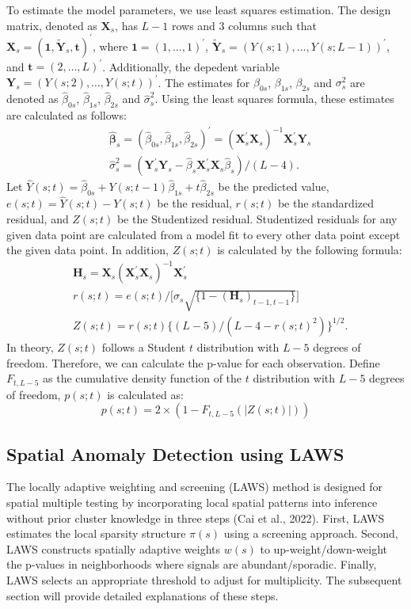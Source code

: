 \documentclass[11pt]{article}
\begin{document}
To estimate the model parameters, we use least squares estimation. The design matrix, denoted as $\bm{X}_s$, has $L-1$ rows and $3$ columns such that $\bm{X}_s=(\mathbf{1}, \tilde{\mathbf{Y}}_s, \mathbf{t})^{\prime}$, where $\mathbf{1}=(1, \ldots, 1)^{\prime}$, $\tilde{\mathbf{Y}}_s=(Y(s;1), \ldots, Y(s;L-1))^{\prime}$, and $\mathbf{t}=(2,\ldots, L)^{\prime}$. Additionally, the depedent variable $\bm{Y}_{s}=(Y(s;2), \ldots, Y(s;t))^{\prime}$. The estimates for $\beta_{0s}$, $\beta_{1s}$, $\beta_{2s}$ and $\sigma_{s}^2$ are denoted as $\hat{\beta}_{0s}$, $\hat{\beta}_{1s}$, $\hat{\beta}_{2s}$ and $\hat{\sigma}_s^2$. Using the least squares formula, these estimates are calculated as follows:
\begin{align}
	&\hat{\bm{\beta}}_s = (\hat{\beta}_{0s}, \hat{\beta}_{1s}, \hat{\beta}_{2s})^{\prime} = (\bm{X}_s^{\prime}\bm{X}_s)^{-1}\bm{X}_s^{\prime}\bm{Y}_s\\
	&\hat{\sigma}_s^2 = (\bm{Y}_s^{\prime}\bm{Y}_s - \hat{\beta}_s\bm{X}_s^{\prime}\bm{X}_s\hat{\beta}_s) / (L-4).
\end{align}
Let $\hat{Y}(s;t)=\hat{\beta}_{0s}+Y(s;t-1)\hat{\beta}_{1s}+t\hat{\beta}_{2s}$ be the predicted value,  $e(s;t)=\hat{Y}(s;t)-Y(s;t)$ be the residual, $r(s;t)$ be the standardized residual, and $Z(s;t)$ be the Studentized residual. Studentized residuals for any given data point are calculated from a model fit to every other data point except the given data point. In addition, $Z(s;t)$ is calculated by the following formula:
\begin{align}
	&\bm{H}_s=\bm{X}_s(\bm{X}_s^{\prime}\bm{X}_s)^{-1}\bm{X}_s^{\prime}\\
	&r(s;t)=e(s;t)/\big[\hat{\sigma}_s\sqrt{\{1-(\bm{H}_s)_{t-1, t-1}\}}\big]\\
	&Z(s;t)=r(s;t)\{(L-5)/(L-4-r(s;t)^2)\}^{1/2}.
\end{align}
In theory, $Z(s;t)$ follows a Student $t$ distribution with $L-5$ degrees of freedom. Therefore, we can calculate the p-value for each observation. Define $F_{t,L-5}$ as the cumulative density function of the $t$ distribution with $L-5$ degrees of freedom,  $p(s;t)$ is calculated as:
\begin{equation}\label{eq: p-value}
p(s;t) = 2 \times (1 - F_{t,L-5}(|Z(s;t)|))
\end{equation}





\subsection{Spatial Anomaly Detection using LAWS}\label{sec:LAWS}
The locally adaptive weighting and screening (LAWS) method is designed for spatial multiple testing by incorporating local spatial patterns into inference without prior cluster knowledge in three steps (Cai et al., 2022). First, LAWS estimates the local sparsity structure $\pi(s)$ using a screening approach. Second, LAWS constructs spatially adaptive weights $w(s)$ to up-weight/down-weight the p-values in neighborhoods where signals are abundant/sporadic. Finally, LAWS selects an appropriate threshold to adjust for multiplicity. The subsequent section will provide detailed explanations of these steps.
\end{document}
